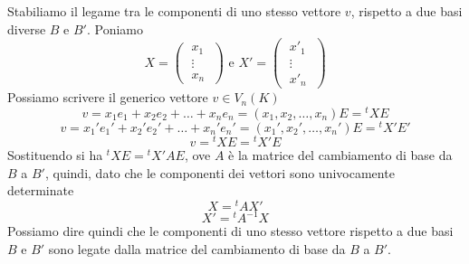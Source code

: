 
Stabiliamo il legame tra le componenti di uno stesso vettore \(v\), rispetto a due basi diverse \(B\) e \(B'\). Poniamo \[
X = \left( \; \begin{matrix} x_1\\ \vdots\\ x_n \end{matrix} \; \right) \text{ e } X'=\left( \; \begin{matrix} x'_1\\ \vdots\\ x'_n \end{matrix} \; \right)
\] Possiamo scrivere il generico vettore \(v \in V_n(K)\) \[
v = x_1e_1+x_2e_2 + \ldots + x_n e_n = (x_1,x_2, \ldots , x_n)E= {^{t}X}E \] \[
v = x_1'e_1'+x_2'e_2' + \ldots + x_n' e_n' = (x_1',x_2', \ldots , x_n')E= {^{t}X'}E'
\] \[
v = {^{t}X}E = {^{t}X'}E
\] Sostituendo si ha \({^{t}X}E = {^tX'}AE\), ove \(A\) è la matrice del cambiamento di base da \(B\) a \(B'\), quindi, dato che le componenti dei vettori sono univocamente determinate \[
X = {^tA}X'
\] \[
X' = {^tA^{-1}}X
\] Possiamo dire quindi che le componenti di uno stesso vettore rispetto a due basi \(B\) e \(B'\) sono legate dalla matrice del cambiamento di base da \(B\) a \(B'\).
